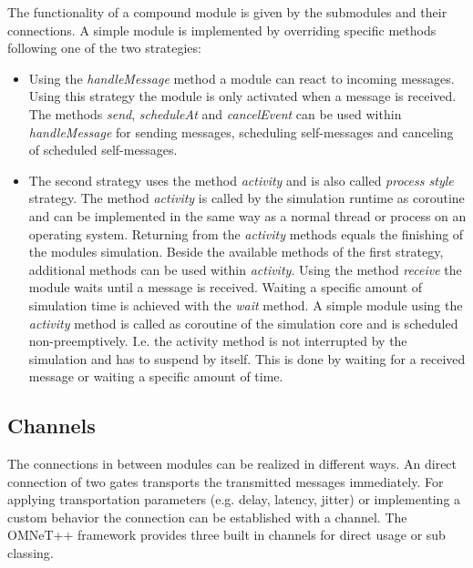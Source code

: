 The functionality of a compound module is given by the submodules and their connections.
A simple module is implemented by overriding specific methods following one of the two strategies:

\begin{itemize}
    \item Using the \emph{handleMessage} method a module can react to incoming messages.
    Using this strategy the module is only activated when a message is received.
    The methods \emph{send}, \emph{scheduleAt} and \emph{cancelEvent} can be used within \emph{handleMessage} for sending messages, scheduling self-messages and canceling of scheduled self-messages. \cite[section 4.4.1]{omnet_manual}
    
    \item The second strategy uses the method \emph{activity} and is also called \emph{process style} strategy.
    The method \emph{activity} is called by the simulation runtime as coroutine and can be implemented in the same way as a normal thread or process on an operating system.
    Returning from the \emph{activity} methods equals the finishing of the modules simulation.
    Beside the available methods of the first strategy, additional methods can be used within \emph{activity}.
    Using the method \emph{receive} the module waits until a message is received.
    Waiting a specific amount of simulation time is achieved with the \emph{wait} method.
    A simple module using the \emph{activity} method is called as coroutine of the simulation core and is scheduled non-preemptively.
    I.e. the activity method is not interrupted by the simulation and has to suspend by itself.
    This is done by waiting for a received message or waiting a specific amount of time. \cite[section 4.4.2]{omnet_manual}
\end{itemize}

\subsection{Channels}
\label{sec:omnet_components_channels}
The connections in between modules can be realized in different ways.
An direct connection of two gates transports the transmitted messages immediately.
For applying transportation parameters (e.g. delay, latency, jitter) or implementing a custom behavior the connection can be established with a channel.
The OMNeT++ framework provides three built in channels for direct usage or sub classing.

